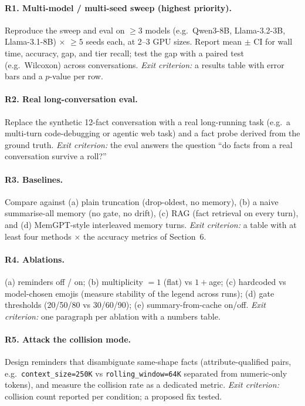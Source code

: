 \documentclass{article}
\begin{document}
\paragraph{R1. Multi-model / multi-seed sweep (highest priority).}
Reproduce the sweep and eval on $\geq 3$ models (e.g.\ Qwen3-8B, Llama-3.2-3B,
Llama-3.1-8B) $\times$ $\geq 5$ seeds each, at 2--3 GPU sizes. Report mean $\pm$ CI for
wall time, accuracy, gap, and tier recall; test the gap with a paired test
(e.g.\ Wilcoxon) across conversations. \emph{Exit criterion:} a results table with
error bars and a $p$-value per row.

\paragraph{R2. Real long-conversation eval.}
Replace the synthetic 12-fact conversation with a real long-running task
(e.g.\ a multi-turn code-debugging or agentic web task) and a fact probe derived from
the ground truth. \emph{Exit criterion:} the eval answers the question ``do facts from
a real conversation survive a roll?''

\paragraph{R3. Baselines.}
Compare against (a) plain truncation (drop-oldest, no memory), (b) a naive
summarise-all memory (no gate, no drift), (c) RAG (fact retrieval on every turn), and
(d) MemGPT-style interleaved memory turns. \emph{Exit criterion:} a table with at least
four methods $\times$ the accuracy metrics of Section~6.

\paragraph{R4. Ablations.}
(a) reminders off / on; (b) multiplicity $=1$ (flat) vs $1+$age; (c) hardcoded vs
model-chosen emojis (measure stability of the legend across runs); (d) gate thresholds
(20/50/80 vs 30/60/90); (e) summary-from-cache on/off. \emph{Exit criterion:} one
paragraph per ablation with a numbers table.

\paragraph{R5. Attack the collision mode.}
Design reminders that disambiguate same-shape facts (attribute-qualified pairs,
e.g.\ \texttt{context\_size=250K} vs \texttt{rolling\_window=64K} separated from
numeric-only tokens), and measure the collision rate as a dedicated metric.
\emph{Exit criterion:} collision count reported per condition; a proposed fix tested.
\end{document}
